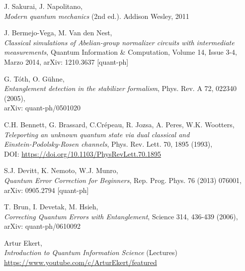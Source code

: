 \documentclass[11pt,a4paper,twoside,pdf]{article}
\numberwithin{equation}{section}
\begin{document}
\begin{thebibliography}{100}
		J. Sakurai, J. Napolitano, \\
		{\em Modern quantum mechanics} (2nd ed.). Addison Wesley, 2011			
		
		J. Bermejo-Vega, M. Van den Nest, \\
		{\em Classical simulations of Abelian-group normalizer circuits with intermediate \\ measurements}, Quantum Information \& Computation, Volume 14, Issue 3-4, \\
		Marzo 2014, arXiv: 1210.3637 [quant-ph]		
	
		G. Tóth, O. Gühne, \\    	
		{\em Entanglement detection in the stabilizer formalism}, Phys. Rev. A 72, 022340 (2005), \\
		arXiv: quant-ph/0501020
		
		C.H. Bennett, G. Brassard, C.Crépeau, R. Jozsa, A. Peres, W.K. Wootters,   \\    	
		{\em Teleporting an unknown quantum state via dual classical and \\
			Einstein-Podolsky-Rosen channels}, Phys. Rev. Lett. 70, 1895 (1993), \\
		DOI: \url{https://doi.org/10.1103/PhysRevLett.70.1895}	

		S.J. Devitt, K. Nemoto, W.J. Munro,   \\    	
		{\em Quantum Error Correction for Beginners}, Rep. Prog. Phys. 76 (2013) 076001, \\
		arXiv: 0905.2794 [quant-ph]
		
		T. Brun, I. Devetak, M. Hsieh,   \\    	
		{\em Correcting Quantum Errors with Entanglement}, Science 314, 436-439 (2006), \\
		arXiv: quant-ph/0610092
		
		
		Artur Ekert, \\
		{\em Introduction to Quantum Information Science} (Lectures) \\
		\url{https://www.youtube.com/c/ArturEkert/featured}


\end{thebibliography}
\end{document}
